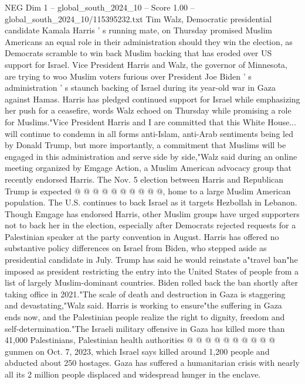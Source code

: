 \begin{textsample}{NEG Dim 1 – global\_south\_2024\_10 – Score 1.00 – global\_south\_2024\_10/115395232.txt}  \label{ex:f1_neg_427}
Tim Walz, Democratic presidential candidate Kamala Harris ' s running mate, on Thursday promised Muslim Americans an equal role in their administration should they win the election, as Democrats scramble to win back Muslim backing that has eroded over US support for Israel.
Vice President Harris and Walz, the governor of Minnesota, are trying to woo Muslim voters furious over President Joe Biden ' s administration ' s staunch backing of Israel during its year-old war in Gaza against Hamas.
Harris has pledged continued support for Israel while emphasizing her push for a ceasefire, words Walz echoed on Thursday while promising a role for Muslims."Vice President Harris and I are committed that this White House... will continue to condemn in all forms anti-Islam, anti-Arab sentiments being led by Donald Trump, but more importantly, a commitment that Muslims will be engaged in this administration and serve side by side,"Walz said during an online meeting organized by Emgage Action, a Muslim American advocacy group that recently endorsed Harris.
The Nov. 5 election between Harris and Republican Trump is expected @ @ @ @ @ @ @ @ @ @, home to a large Muslim American population.
The U.S. continues to back Israel as it targets Hezbollah in Lebanon.
Though Emgage has endorsed Harris, other Muslim groups have urged supporters not to back her in the election, especially after Democrats rejected requests for a Palestinian speaker at the party convention in August.
Harris has offered no substantive policy differences on Israel from Biden, who stepped aside as presidential candidate in July.
Trump has said he would reinstate a"travel ban"he imposed as president restricting the entry into the United States of people from a list of largely Muslim-dominant countries.
Biden rolled back the ban shortly after taking office in 2021."The scale of death and destruction in Gaza is staggering and devastating,"Walz said.
Harris is working to ensure"the suffering in Gaza ends now, and the Palestinian people realize the right to dignity, freedom and self-determination."The Israeli military offensive in Gaza has killed more than 41,000 Palestinians, Palestinian health authorities @ @ @ @ @ @ @ @ @ @ gunmen on Oct. 7, 2023, which Israel says killed around 1,200 people and abducted about 250 hostages.
Gaza has suffered a humanitarian crisis with nearly all its 2 million people displaced and widespread hunger in the enclave.

\end{textsample}
